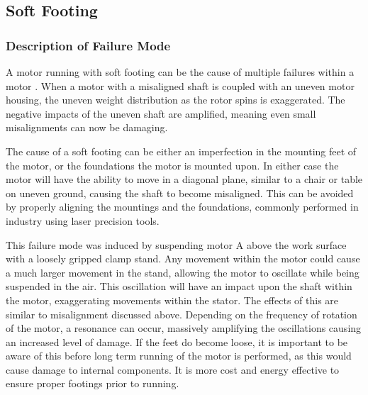 

\subsection{Soft Footing}

\subsubsection{Description of Failure Mode}
A motor running with soft footing can be the cause of multiple failures within a motor \cite{finley1999analytical}. When a motor with a misaligned shaft is coupled with an uneven motor housing, the uneven weight distribution as the rotor spins is exaggerated. The negative impacts of the uneven shaft are amplified, meaning even small misalignments can now be damaging. 

The cause of a soft footing can be either an imperfection in the mounting feet of the motor, or the foundations the motor is mounted upon. In either case the motor will have the ability to move in a diagonal plane, similar to a chair or table on uneven ground, causing the shaft to become misaligned. This can be avoided by properly aligning the mountings and the foundations, commonly performed in industry using laser precision tools. 

This failure mode was induced by suspending motor A above the work surface with a loosely gripped clamp stand. Any movement within the motor could cause a much larger movement in the stand, allowing the motor to oscillate while being suspended in the air. This oscillation will have an impact upon the shaft within the motor, exaggerating movements within the stator. The effects of this are similar to misalignment discussed above. Depending on the frequency of rotation of the motor, a resonance can occur, massively amplifying the oscillations causing an increased level of damage. If the feet do become loose, it is important to be aware of this before long term running of the motor is performed, as this would cause damage to internal components. It is more cost and energy effective to ensure proper footings prior to running.

